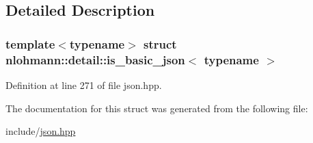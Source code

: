 \subsection{Detailed Description}
\subsubsection*{template$<$typename$>$\newline
struct nlohmann\+::detail\+::is\+\_\+basic\+\_\+json$<$ typename $>$}



Definition at line 271 of file json.\+hpp.



The documentation for this struct was generated from the following file\+:\begin{DoxyCompactItemize}
\item 
include/\hyperlink{json_8hpp}{json.\+hpp}\end{DoxyCompactItemize}
